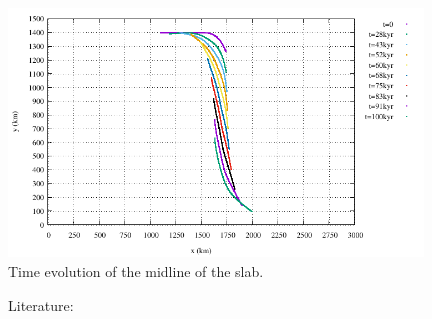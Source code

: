 \begin{center}
\includegraphics[width=11cm]{python_codes/fieldstone_55/images/mid_evolution}\\
{\captionfont Time evolution of the midline of the slab.}
\end{center}



\vspace{3cm}



Literature: \cite{fogm14}
